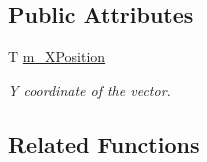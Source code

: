 \subsection*{Public Attributes}
\begin{DoxyCompactItemize}
\item 
T \hyperlink{class_triton_1_1_util_1_1_vector1_a379cb608c766a1eed8f730fcff9dff9c}{m\+\_\+\+X\+Position}
\begin{DoxyCompactList}\small\item\em Y coordinate of the vector. \end{DoxyCompactList}\end{DoxyCompactItemize}
\subsection*{Related Functions}
